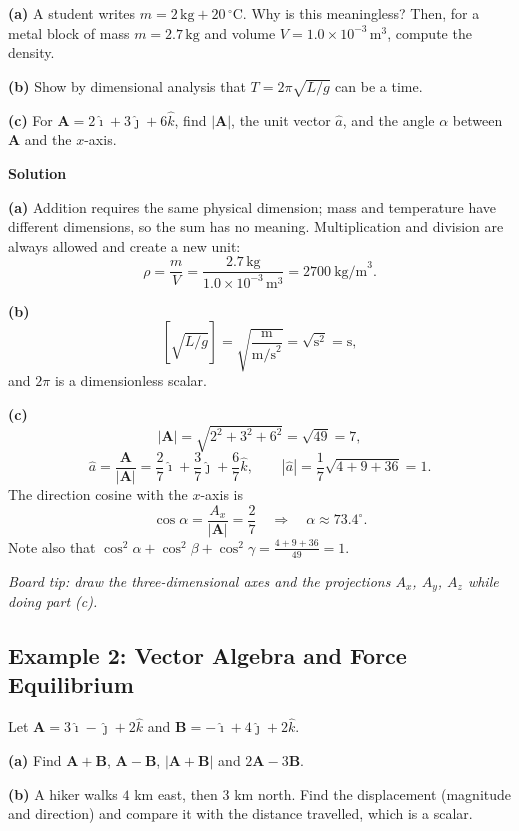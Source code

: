 \documentclass[../main.tex]{subfiles}
\begin{document}
\textbf{(a)} A student writes $m = 2\,\text{kg} + 20\,^\circ\text{C}$. Why is this meaningless? Then, for a metal block of mass $m = 2.7\,\text{kg}$ and volume $V = 1.0\times 10^{-3}\,\text{m}^3$, compute the density.

\textbf{(b)} Show by dimensional analysis that $T = 2\pi\sqrt{L/g}$ can be a time.

\textbf{(c)} For $\mathbf{A} = 2\hat{\imath} + 3\hat{\jmath} + 6\hat{k}$, find $|\mathbf{A}|$, the unit vector $\hat{a}$, and the angle $\alpha$ between $\mathbf{A}$ and the $x$-axis.

\bigskip
\textbf{Solution}

\textbf{(a)} Addition requires the same physical dimension; mass and temperature have different dimensions, so the sum has no meaning. Multiplication and division are always allowed and create a new unit:
\[
\rho = \frac{m}{V} = \frac{2.7\,\text{kg}}{1.0\times 10^{-3}\,\text{m}^3} = 2700\ \text{kg/m}^3 .
\]

\textbf{(b)}
\[
\left[\sqrt{L/g}\right] = \sqrt{\frac{\text{m}}{\text{m/s}^2}} = \sqrt{\text{s}^2} = \text{s},
\]
and $2\pi$ is a dimensionless scalar.

\textbf{(c)}
\[
|\mathbf{A}| = \sqrt{2^2+3^2+6^2} = \sqrt{49} = 7,
\]
\[
\hat{a} = \frac{\mathbf{A}}{|\mathbf{A}|} = \frac{2}{7}\hat{\imath} + \frac{3}{7}\hat{\jmath} + \frac{6}{7}\hat{k},
\qquad
|\hat{a}| = \frac{1}{7}\sqrt{4+9+36} = 1 .
\]
The direction cosine with the $x$-axis is
\[
\cos\alpha = \frac{A_x}{|\mathbf{A}|} = \frac{2}{7}
\quad \Longrightarrow \quad \alpha \approx 73.4^\circ .
\]
Note also that $\cos^2\alpha + \cos^2\beta + \cos^2\gamma = \frac{4+9+36}{49} = 1$.

\bigskip
\noindent \emph{Board tip: draw the three-dimensional axes and the projections $A_x$, $A_y$, $A_z$ while doing part (c).}


\subsection{Example 2: Vector Algebra and Force Equilibrium}

Let $\mathbf{A} = 3\hat{\imath} - \hat{\jmath} + 2\hat{k}$ and $\mathbf{B} = -\hat{\imath} + 4\hat{\jmath} + 2\hat{k}$.

\textbf{(a)} Find $\mathbf{A}+\mathbf{B}$, $\mathbf{A}-\mathbf{B}$, $|\mathbf{A}+\mathbf{B}|$ and $2\mathbf{A}-3\mathbf{B}$.

\textbf{(b)} A hiker walks $4$ km east, then $3$ km north. Find the displacement (magnitude and direction) and compare it with the distance travelled, which is a scalar.
\end{document}

